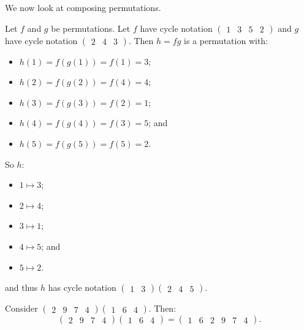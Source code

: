 We now look at composing permutations.
\begin{example}
    Let $f$ and $g$ be permutations. Let $f$ have cycle notation $\begin{pmatrix}1 & 3 & 5 & 2\end{pmatrix}$ and $g$ have cycle notation $\begin{pmatrix}2 & 4 & 3\end{pmatrix}$. Then $h = fg$ is a permutation with:
    \begin{itemize}
        \item $h(1) = f(g(1)) = f(1) = 3$;
        \item $h(2) = f(g(2)) = f(4) = 4$;
        \item $h(3) = f(g(3)) = f(2) = 1$;
        \item $h(4) = f(g(4)) = f(3) = 5$; and
        \item $h(5) = f(g(5)) = f(5) = 2$.
    \end{itemize}

    So $h$:
    \begin{itemize}
        \item $1 \mapsto 3$;
        \item $2 \mapsto 4$;
        \item $3 \mapsto 1$;
        \item $4 \mapsto 5$; and
        \item $5 \mapsto 2$.
    \end{itemize}
    and thus $h$ has cycle notation $\begin{pmatrix}1 & 3\end{pmatrix}\begin{pmatrix}2 & 4 & 5\end{pmatrix}$.
\end{example}

\begin{example}
    Consider $\begin{pmatrix}2 & 9 & 7 & 4\end{pmatrix}\begin{pmatrix}1 & 6 & 4\end{pmatrix}$. Then:
    \[\begin{pmatrix}2 & 9 & 7 & 4\end{pmatrix}\begin{pmatrix}1 & 6 & 4\end{pmatrix} = \begin{pmatrix}1 & 6 & 2 & 9 & 7 & 4\end{pmatrix}.\]
\end{example}

